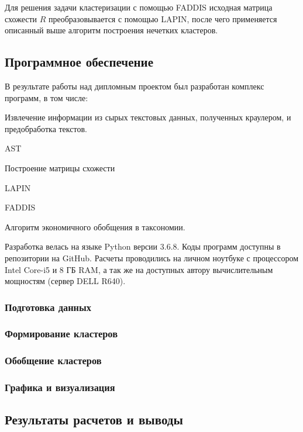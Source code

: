 \documentclass[12pt]{article}
\newenvironment{itemize*}%
{\begin{itemize}%
	\setlength{\itemsep}{0pt}%
	\setlength{\parskip}{0pt}}%
{\end{itemize}}
\let\oldsubsection\subsection
\renewcommand{\subsection}{\clearpage\oldsubsection}
\begin{document}
Для решения задачи кластеризации с помощью FADDIS исходная матрица схожести $R$ преобразовывается с помощью LAPIN, после чего применяется описанный выше алгоритм построения нечетких кластеров.

\subsection{Программное обеспечение}

В результате работы над дипломным проектом был разработан комплекс программ, в том числе:

\begin{itemize*} %
	\item Извлечение информации из сырых текстовых данных, полученных краулером, и предобработка текстов.
	\item AST
	\item Построение матрицы схожести 
	\item LAPIN
	\item FADDIS
	\item Алгоритм экономичного обобщения в таксономии.
\end{itemize*} %

Разработка велась на языке Python версии 3.6.8. Коды программ доступны в репозитории на GitHub. %
Расчеты проводились на личном ноутбуке с процессором Intel Core-i5 и 8 ГБ RAM, а так же на доступных автору вычислительным мощностям (сервер DELL R640).

\subsubsection{Подготовка данных}
\subsubsection{Формирование кластеров}
\subsubsection{Обобщение кластеров}
\subsubsection{Графика и визуализация}

\subsection{Результаты расчетов и выводы}
\end{document}
